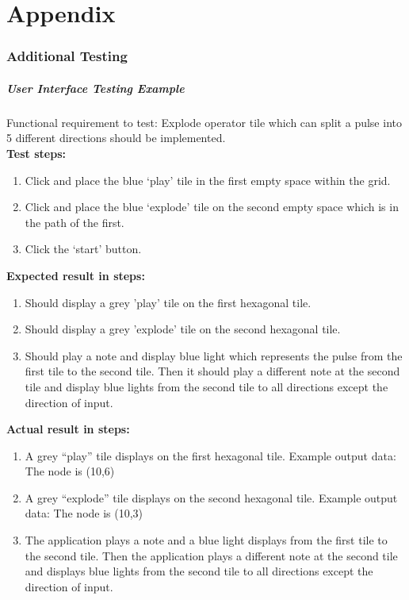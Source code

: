 \documentclass[10pt,a4paper]{article}
\begin{document}
\part{Appendix}
\section{Additional Testing}
\subsubsection{User Interface Testing Example}

Functional requirement to test: Explode operator tile which can split a pulse into 5 different directions should be implemented.\\

\textbf{Test steps:}
\begin{enumerate}
\item Click and place the blue ‘play’ tile in the first empty space within the grid.

\item Click and place the blue ‘explode’ tile on the second empty space which is in the path of the first.

\item Click the ‘start’ button.
\end{enumerate}

\textbf{Expected result in steps:}
\begin{enumerate}
\item Should display a grey 'play' tile on the first hexagonal tile.

\item Should display a grey 'explode' tile on the second hexagonal tile.

\item Should play a note and display blue light which represents the pulse from the first tile to the second tile. Then it should play a different note at the second tile and display blue lights from the second tile to all directions except the direction of input.
\end{enumerate}

\textbf{Actual result in steps:}
\begin{enumerate}
\item A grey “play” tile displays on the first hexagonal tile. Example output data: The node is (10,6)

\item A grey “explode” tile displays on the second hexagonal tile. Example output data: The node is (10,3)

\item The application plays a note and a blue light displays from the first tile to the second tile. Then the application plays a different note at the second tile and displays blue lights from the second tile to all directions except the direction of input.
\end{enumerate}
\end{document}

